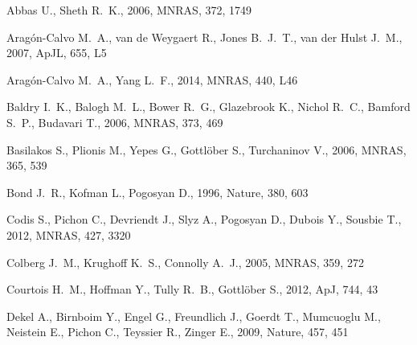 \documentclass[useAMS,usenatbib]{mn2e}
\newcommand{\apj}{ApJ}
\newcommand{\apjl}{ApJL}
\newcommand{\mnras}{MNRAS}
\newcommand{\nat}{Nature}
\begin{document}

%
\begin{thebibliography}{}

{Abbas} U.,  {Sheth} R.~K.,  2006, \mnras, 372, 1749

{Arag{\'o}n-Calvo} M.~A.,  {van de Weygaert} R.,  {Jones} B.~J.~T.,    {van der
  Hulst} J.~M.,  2007, \apjl, 655, L5

{Arag{\'o}n-Calvo} M.~A.,  {Yang} L.~F.,  2014, \mnras, 440, L46

{Baldry} I.~K.,  {Balogh} M.~L.,  {Bower} R.~G.,  {Glazebrook} K.,  {Nichol}
  R.~C.,  {Bamford} S.~P.,    {Budavari} T.,  2006, \mnras, 373, 469

{Basilakos} S.,  {Plionis} M.,  {Yepes} G.,  {Gottl{\"o}ber} S.,
  {Turchaninov} V.,  2006, \mnras, 365, 539

{Bond} J.~R.,  {Kofman} L.,    {Pogosyan} D.,  1996, \nat, 380, 603

{Codis} S.,  {Pichon} C.,  {Devriendt} J.,  {Slyz} A.,  {Pogosyan} D.,
  {Dubois} Y.,    {Sousbie} T.,  2012, \mnras, 427, 3320

{Colberg} J.~M.,  {Krughoff} K.~S.,    {Connolly} A.~J.,  2005, \mnras, 359,
  272

{Courtois} H.~M.,  {Hoffman} Y.,  {Tully} R.~B.,    {Gottl{\"o}ber} S.,  2012,
  \apj, 744, 43

{Dekel} A.,  {Birnboim} Y.,  {Engel} G.,  {Freundlich} J.,  {Goerdt} T.,
  {Mumcuoglu} M.,  {Neistein} E.,  {Pichon} C.,  {Teyssier} R.,    {Zinger} E.,
   2009, \nat, 457, 451


\end{thebibliography}
\end{document}
